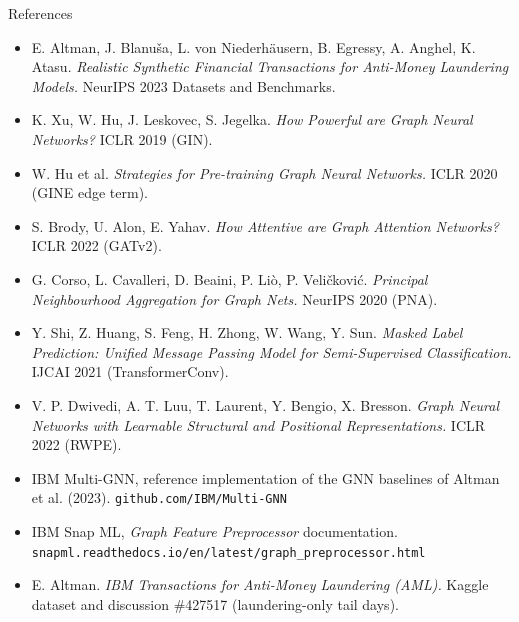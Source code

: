 \documentclass[aspectratio=169,10pt,t]{beamer}
\begin{document}
\begin{frame}{References}
  \scriptsize
  \begin{itemize}
    \item E. Altman, J. Blanu\v{s}a, L. von Niederhäusern, B. Egressy, A. Anghel, K. Atasu.
          \emph{Realistic Synthetic Financial Transactions for Anti-Money Laundering Models.}
          NeurIPS 2023 Datasets and Benchmarks.
    \item K. Xu, W. Hu, J. Leskovec, S. Jegelka. \emph{How Powerful are Graph Neural Networks?} ICLR 2019 (GIN).
    \item W. Hu et al. \emph{Strategies for Pre-training Graph Neural Networks.} ICLR 2020 (GINE edge term).
    \item S. Brody, U. Alon, E. Yahav. \emph{How Attentive are Graph Attention Networks?} ICLR 2022 (GATv2).
    \item G. Corso, L. Cavalleri, D. Beaini, P. Liò, P. Veli\v{c}kovi\'c.
          \emph{Principal Neighbourhood Aggregation for Graph Nets.} NeurIPS 2020 (PNA).
    \item Y. Shi, Z. Huang, S. Feng, H. Zhong, W. Wang, Y. Sun. \emph{Masked Label Prediction: Unified
          Message Passing Model for Semi-Supervised Classification.} IJCAI 2021 (TransformerConv).
    \item V. P. Dwivedi, A. T. Luu, T. Laurent, Y. Bengio, X. Bresson. \emph{Graph Neural Networks with
          Learnable Structural and Positional Representations.} ICLR 2022 (RWPE).
    \item IBM Multi-GNN, reference implementation of the GNN baselines of Altman et al. (2023).
          \texttt{github.com/IBM/Multi-GNN}
    \item IBM Snap ML, \emph{Graph Feature Preprocessor} documentation.
          \texttt{snapml.readthedocs.io/en/latest/graph\_preprocessor.html}
    \item E. Altman. \emph{IBM Transactions for Anti-Money Laundering (AML).} Kaggle dataset and
          discussion \#427517 (laundering-only tail days).
  \end{itemize}
\end{frame}
\end{document}
